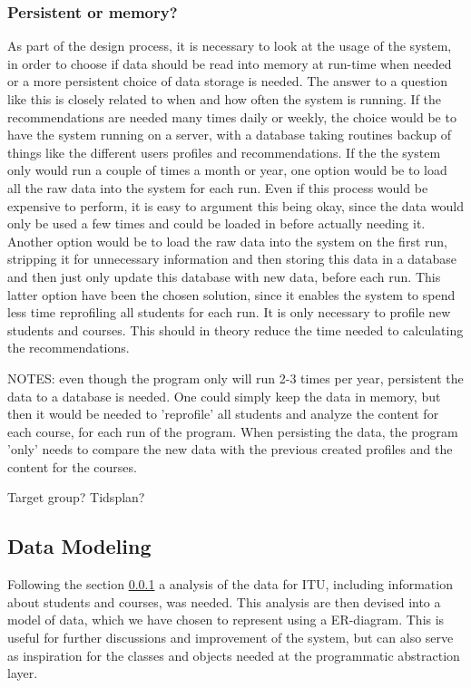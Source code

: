 \subsubsection{Persistent or memory?}
\label{subsec:persistent}
As part of the design process, it is necessary to look at the usage of the system, in order to choose if data should be read into memory at run-time when needed or a more persistent choice of data storage is needed. The answer to a question like this is closely related to when and how often the system is running. If the recommendations are needed many times daily or weekly, the choice would be to have the system running on a server, with a database taking routines backup of things like the different users profiles and recommendations. If the the system only would run a couple of times a month or year, one option would be to load all the raw data into the system for each run. Even if this process would be expensive to perform, it is easy to argument this being okay, since the data would only be used a few times and could be loaded in before actually needing it. Another option would be to load the raw data into the system on the first run, stripping it for unnecessary information and then storing this data in a database and then just only update this database with new data, before each run. This latter option have been the chosen solution, since it enables the system to spend less time reprofiling all students for each run. It is only necessary to profile new students and courses. This should in theory reduce the time needed to calculating the recommendations.

NOTES:
even though the program only will run 2-3 times per year, persistent the data to a database is needed. One could simply keep the data in memory, but then it would be needed to 'reprofile' all students and analyze the content for each course, for each run of the program. When persisting the data, the program 'only' needs to compare the new data with the previous created profiles and the content for the courses.


Target group?
Tidsplan?
\subsection{Data Modeling}
Following the section \ref{subsec:persistent} a analysis of the data for ITU, including information about students and courses, was needed. This analysis are then devised into a model of data, which we have chosen to represent using a ER-diagram. This is useful for further discussions and improvement of the system, but can also serve as inspiration for the classes and objects needed at the programmatic abstraction layer. 

